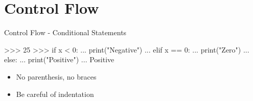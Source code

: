 \documentclass[10pt]{beamer}
\begin{document}

%
%
%    
%
%
%
%


\section{Control Flow}


\begin{frame}[fragile]{Control Flow - Conditional Statements}

\begin{pythoncode}
>>> 25
>>> if x < 0:
...     print("Negative")
... elif x == 0:
...     print("Zero")
... else:
...     print("Positive")
...
Positive

\end{pythoncode}

\begin{itemize}
\item  No parenthesis, no braces
\item  Be careful of indentation
\end{itemize}

\end{frame}
\end{document}
